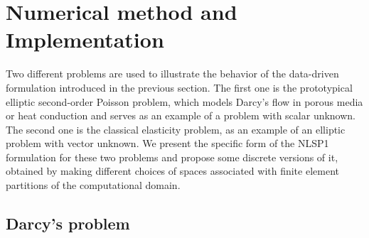 \section{Numerical method and Implementation}

Two different problems are used to illustrate the behavior of the data-driven 
formulation introduced in the previous section. The first one is the 
prototypical elliptic second-order Poisson problem, which models Darcy's flow 
in porous media or heat conduction and serves as an example of a problem with 
scalar unknown. The second one is the classical elasticity problem, 
as an example of an elliptic problem with vector unknown. We present the 
specific form of the NLSP1 formulation for these two problems and propose some 
discrete versions of it, obtained by making different choices of spaces associated 
with finite element partitions of the computational domain.

\subsection{Darcy's problem}

